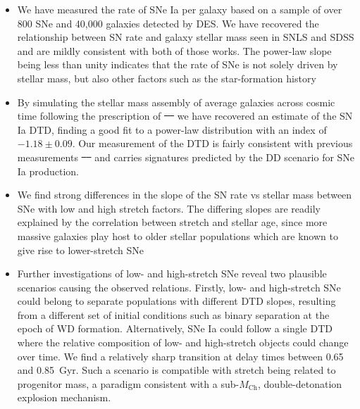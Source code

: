 \documentclass[fleqn,usenatbib]{mnras}
\providecommand{\DIFadd}[1]{{\protect\color{blue}\uwave{#1}}} %
\providecommand{\DIFdel}[1]{{\protect\color{red}\sout{#1}}}                      %
\providecommand{\DIFaddbegin}{} %
\providecommand{\DIFaddend}{} %
\providecommand{\DIFdelbegin}{} %
\providecommand{\DIFdelend}{} %
\newcommand{\DIFscaledelfig}{0.5}
\newlength{\DIFdelgraphicswidth} %
\newlength{\DIFdelgraphicsheight} %
\newcommand{\DIFaddincludegraphics}[2][]{{\color{blue}\fbox{\DIFOincludegraphics[#1]{#2}}}} %
\newcommand{\DIFdelincludegraphics}[2][]{%
\sbox{\DIFdelgraphicsbox}{\DIFOincludegraphics[#1]{#2}}%
\settoboxwidth{\DIFdelgraphicswidth}{\DIFdelgraphicsbox} %
\settoboxtotalheight{\DIFdelgraphicsheight}{\DIFdelgraphicsbox} %
\scalebox{\DIFscaledelfig}{%
\parbox[b]{\DIFdelgraphicswidth}{\usebox{\DIFdelgraphicsbox}\\[-\baselineskip] \rule{\DIFdelgraphicswidth}{0em}}\llap{\resizebox{\DIFdelgraphicswidth}{\DIFdelgraphicsheight}{%
\setlength{\unitlength}{\DIFdelgraphicswidth}%
\begin{picture}(1,1)%
\thicklines\linethickness{2pt} %
{\color[rgb]{1,0,0}\put(0,0){\framebox(1,1){}}}%
{\color[rgb]{1,0,0}\put(0,0){\line( 1,1){1}}}%
{\color[rgb]{1,0,0}\put(0,1){\line(1,-1){1}}}%
\end{picture}%
}\hspace*{3pt}}} %
} %
\DeclareRobustCommand{\DIFaddbegin}{\DIFOaddbegin \let\includegraphics\DIFaddincludegraphics} %
\DeclareRobustCommand{\DIFaddend}{\DIFOaddend \let\includegraphics\DIFOincludegraphics} %
\DeclareRobustCommand{\DIFdelbegin}{\DIFOdelbegin \let\includegraphics\DIFdelincludegraphics} %
\DeclareRobustCommand{\DIFdelend}{\DIFOaddend \let\includegraphics\DIFOincludegraphics} %
\begin{document}
\begin{itemize}
\item We have measured the rate of SNe Ia per galaxy based on a sample of over 800 SNe and 40,000 galaxies detected by DES. We have recovered the relationship between SN rate and galaxy stellar mass seen in SNLS \citep{Sullivan2006} and SDSS \citep{Smith2012} and are mildly consistent with both of those works. The power-law slope being less than unity indicates that the rate of SNe is not solely driven by stellar mass, but also other factors such as the star-formation history

\item By simulating the stellar mass assembly of average galaxies across cosmic time following the prescription of \DIFdelbegin \DIFdel{\mbox{%
\citet{Childress2014} }\hspace{0pt}%
}\DIFdelend \DIFaddbegin \DIFadd{\mbox{%
\citetalias{Childress2014} }\hspace{0pt}%
}\DIFaddend we have recovered an estimate of the SN Ia DTD, finding a good fit to a power-law distribution with an index of \DIFdelbegin \DIFdel{$-1.18 \pm0.09$}\DIFdelend \DIFaddbegin \DIFadd{$-1.14 \pm0.05$}\DIFaddend . Our measurement of the DTD is fairly consistent with previous measurements \DIFdelbegin \DIFdel{\mbox{%
\citep[e.g.][]{Graur2013,Maoz2012} }\hspace{0pt}%
}\DIFdelend \DIFaddbegin \DIFadd{\mbox{%
\citep[e.g.][]{Graur2013,Maoz2017} }\hspace{0pt}%
}\DIFaddend and carries signatures predicted by the DD scenario for SNe Ia production.

\item We find strong differences in the slope of the SN rate vs stellar mass between SNe with low and high stretch factors. The differing slopes are readily explained by the correlation between stretch and stellar age, since more massive galaxies play host to older stellar populations which are known to give rise to lower-stretch SNe

\item Further investigations of low- and high-stretch SNe reveal two plausible scenarios causing the observed relations. Firstly, low- and high-stretch SNe could belong to separate populations with different DTD slopes, resulting from a different set of initial conditions such as binary separation at the epoch of WD formation. Alternatively, SNe Ia could follow a single DTD where the relative composition of low- and high-stretch objects could change over time. We find a relatively sharp transition at delay times between 0.65 and 0.85~Gyr. Such a scenario is compatible with stretch being related to progenitor mass, a paradigm consistent with a sub-$M_{\mathrm{Ch}}$, double-detonation explosion mechanism. 
\end{itemize}
\end{document}
